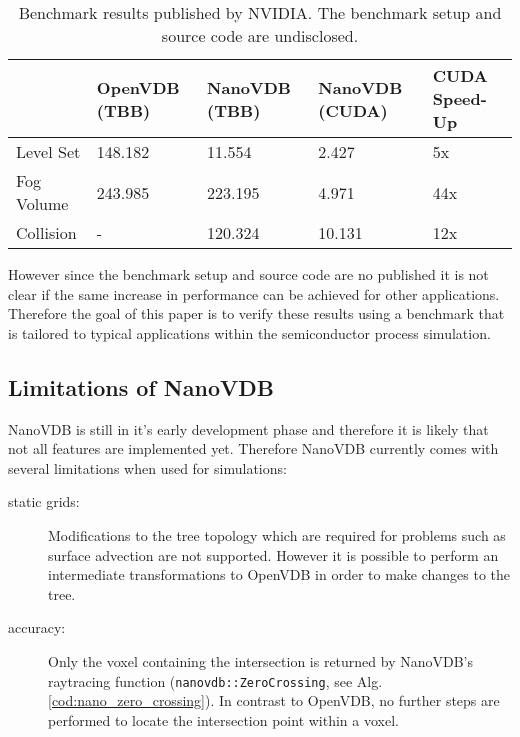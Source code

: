 \begin{table}[H]
	\caption{Benchmark results published by NVIDIA. The benchmark setup and source code are undisclosed. \cite{nanovdb_nvidia}}
	\centering
	\begin{tabular}{@{}lllll@{}}
		\toprule
		           & OpenVDB (TBB) & NanoVDB (TBB) & NanoVDB (CUDA) & CUDA Speed-Up \\	\hline
		Level Set  & 148.182       & 11.554        & 2.427          & 5x            \\
		Fog Volume & 243.985       & 223.195       & 4.971          & 44x           \\
		Collision  & -             & 120.324       & 10.131         & 12x           \\ \bottomrule
	\end{tabular}
	\label{tab:nvidia_benchmark}
\end{table}


However since the benchmark setup and source code are no published it is not clear if the same increase in performance can be achieved for other applications.
Therefore the goal of this paper is to verify these results using a benchmark that is tailored to typical applications within the semiconductor process simulation.

\newpage
\subsection{Limitations of NanoVDB}
\label{chap:limitations}

NanoVDB is still in it's early development phase and therefore it is likely that not all features are implemented yet.
Therefore NanoVDB currently comes with several limitations when used for simulations:

\begin{description}
	\item[static grids:] Modifications to the tree topology which are required for problems such as surface advection are not supported.
	      However it is possible to perform an intermediate transformations to OpenVDB in order to make changes to the tree.
	\item[accuracy:] Only the voxel containing the intersection is returned by NanoVDB's raytracing function (\texttt{nanovdb::ZeroCrossing}, see Alg. \ref{cod:nano_zero_crossing}).
	      In contrast to OpenVDB, no further steps are performed to locate the intersection point within a voxel.
\end{description}




